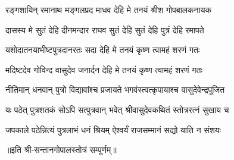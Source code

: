 \twolineshloka
{रङ्गशायिन् रमानाथ मङ्गलप्रद माधव}
{देहि मे तनयं श्रीश गोपबालकनायक}%

\twolineshloka
{दासस्य मे सुतं देहि दीनमन्दार राघव}
{सुतं देहि सुतं देहि पुत्रं देहि रमापते}%

\twolineshloka
{यशोदातनयाभीष्टपुत्रदानरतः सदा}
{देहि मे तनयं कृष्ण त्वामहं शरणं गतः}%

\twolineshloka
{मदिष्टदेव गोविन्द वासुदेव जनार्दन}
{देहि मे तनयं कृष्ण त्वामहं शरणं गतः}%

\twolineshloka
{नीतिमान् धनवान् पुत्रो विद्यावांश्च प्रजायते}
{भगवंस्त्वत्कृपायाश्च वासुदेवेन्द्रपूजित}%

\twolineshloka
{यः पठेत् पुत्रशतकं सोऽपि सत्पुत्रवान् भवेत्}
{श्रीवासुदेवकथितं स्तोत्ररत्नं सुखाय च}%

\twolineshloka
{जपकाले पठेन्नित्यं पुत्रलाभं धनं श्रियम्}
{ऐश्वर्यं राजसम्मानं सद्यो याति न संशयः}%

{॥इति श्री-सन्तानगोपालस्तोत्रं सम्पूर्णम्॥}